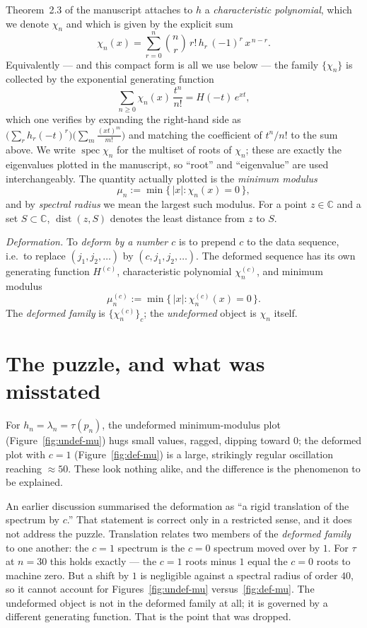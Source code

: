 \documentclass[11pt, fleqn]{amsart}
\theoremstyle{remark}
\DeclareMathOperator{\dist}{dist}
\DeclareMathOperator{\spec}{spec}
\begin{document}
Theorem~2.3 of the manuscript attaches to $h$ a \emph{characteristic polynomial}, which we
denote $\chi_n$ and which is given by the explicit sum
\[
\chi_n(x)=\sum_{r=0}^{n}\binom{n}{r}\,r!\,h_r\,(-1)^r\,x^{\,n-r}.
\]
Equivalently --- and this compact form is all we use below --- the family $\{\chi_n\}$ is
collected by the exponential generating function
\[
\sum_{n\ge0}\chi_n(x)\,\frac{t^n}{n!}=H(-t)\,e^{xt},
\]
which one verifies by expanding the right-hand side as
$\big(\sum_r h_r(-t)^r\big)\big(\sum_m \tfrac{(xt)^m}{m!}\big)$ and matching the coefficient
of $t^n/n!$ to the sum above.
We write $\spec\chi_n$ for the multiset of roots of $\chi_n$; these are exactly the
eigenvalues plotted in the manuscript, so ``root'' and ``eigenvalue'' are used
interchangeably. The quantity actually plotted is the \emph{minimum modulus}
\[
\mu_n:=\min\{\,|x| : \chi_n(x)=0\,\},
\]
and by \emph{spectral radius} we mean the largest such modulus. For a point $z\in\mathbb{C}$
and a set $S\subset\mathbb{C}$, $\dist(z,S)$ denotes the least distance from $z$ to $S$.

\emph{Deformation.} To \emph{deform by a number $c$} is to prepend $c$ to the data
sequence, i.e.\ to replace $(j_1,j_2,\dots)$ by $(c,j_1,j_2,\dots)$. The deformed sequence
has its own generating function $H^{(c)}$, characteristic polynomial $\chi_n^{(c)}$, and
minimum modulus
\[
\mu_n^{(c)}:=\min\{\,|x| : \chi_n^{(c)}(x)=0\,\}.
\]
The \emph{deformed family} is $\{\chi_n^{(c)}\}_{c}$; the \emph{undeformed} object is $\chi_n$
itself.

\section{The puzzle, and what was misstated}\label{sec:puzzle}

For $h_n=\lambda_n=\tau(p_n)$, the undeformed minimum-modulus plot (Figure~\ref{fig:undef-mu})
hugs small values, ragged, dipping toward $0$; the deformed plot with $c=1$
(Figure~\ref{fig:def-mu}) is a large, strikingly regular oscillation reaching $\approx50$.
These look nothing alike, and the difference is the phenomenon to be explained.

An earlier discussion summarised the deformation as ``a rigid translation of the spectrum
by $c$.'' That statement is correct only in a restricted sense, and it does not address the
puzzle. Translation relates two members of the \emph{deformed family} to one another: the
$c=1$ spectrum is the $c=0$ spectrum moved over by $1$. For $\tau$ at $n=30$ this holds
exactly --- the $c=1$ roots minus $1$ equal the $c=0$ roots to machine zero. But a shift by
$1$ is negligible against a spectral radius of order $40$, so it cannot account for
Figures~\ref{fig:undef-mu} versus~\ref{fig:def-mu}. The undeformed object is not in the
deformed family at all; it is governed by a different generating function. That is the point
that was dropped.
\end{document}
